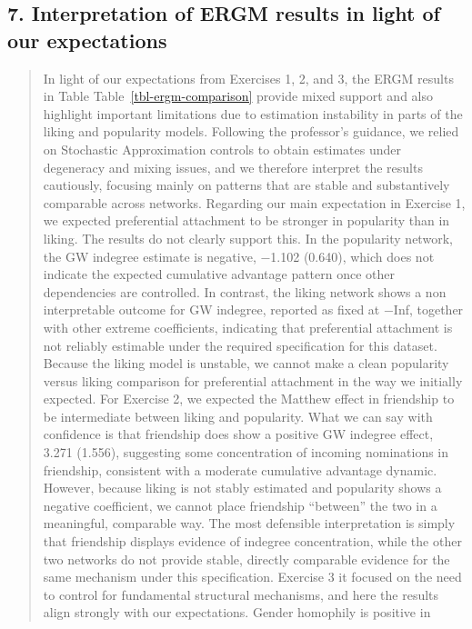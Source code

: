 \documentclass[
  letterpaper,
  DIV=11,
  numbers=noendperiod]{scrartcl}
\begin{document}
\subsection{7. Interpretation of ERGM results in light of our
expectations}\label{interpretation-of-ergm-results-in-light-of-our-expectations}

\begin{quote}
In light of our expectations from Exercises 1, 2, and 3, the ERGM
results in Table Table~\ref{tbl-ergm-comparison} provide mixed support
and also highlight important limitations due to estimation instability
in parts of the liking and popularity models. Following the professor's
guidance, we relied on Stochastic Approximation controls to obtain
estimates under degeneracy and mixing issues, and we therefore interpret
the results cautiously, focusing mainly on patterns that are stable and
substantively comparable across networks. Regarding our main expectation
in Exercise 1, we expected preferential attachment to be stronger in
popularity than in liking. The results do not clearly support this. In
the popularity network, the GW indegree estimate is negative, −1.102
(0.640), which does not indicate the expected cumulative advantage
pattern once other dependencies are controlled. In contrast, the liking
network shows a non interpretable outcome for GW indegree, reported as
fixed at −Inf, together with other extreme coefficients, indicating that
preferential attachment is not reliably estimable under the required
specification for this dataset. Because the liking model is unstable, we
cannot make a clean popularity versus liking comparison for preferential
attachment in the way we initially expected. For Exercise 2, we expected
the Matthew effect in friendship to be intermediate between liking and
popularity. What we can say with confidence is that friendship does show
a positive GW indegree effect, 3.271 (1.556), suggesting some
concentration of incoming nominations in friendship, consistent with a
moderate cumulative advantage dynamic. However, because liking is not
stably estimated and popularity shows a negative coefficient, we cannot
place friendship ``between'' the two in a meaningful, comparable way.
The most defensible interpretation is simply that friendship displays
evidence of indegree concentration, while the other two networks do not
provide stable, directly comparable evidence for the same mechanism
under this specification. Exercise 3 it focused on the need to control
for fundamental structural mechanisms, and here the results align
strongly with our expectations. Gender homophily is positive in

\end{quote}
\end{document}
